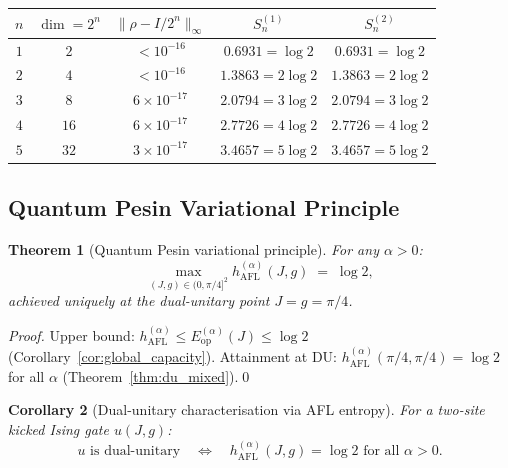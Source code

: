 \documentclass[12pt,a4paper]{article}
\newtheorem{theorem}{Theorem}[section]
\newtheorem{corollary}[theorem]{Corollary}
\begin{document}
\begin{center}
\begin{tabular}{@{}ccccc@{}}
\toprule
$n$ & $\dim=2^n$ & $\|\rho-I/2^n\|_\infty$ & $S^{(1)}_n$ & $S^{(2)}_n$\\
\midrule
$1$ & $2$  & $<10^{-16}$ & $0.6931 = \log 2$ & $0.6931 = \log 2$\\
$2$ & $4$  & $<10^{-16}$ & $1.3863 = 2\log 2$ & $1.3863 = 2\log 2$\\
$3$ & $8$  & $6\times10^{-17}$ & $2.0794 = 3\log 2$ & $2.0794 = 3\log 2$\\
$4$ & $16$ & $6\times10^{-17}$ & $2.7726 = 4\log 2$ & $2.7726 = 4\log 2$\\
$5$ & $32$ & $3\times10^{-17}$ & $3.4657 = 5\log 2$ & $3.4657 = 5\log 2$\\
\bottomrule
\end{tabular}
\end{center}

\subsection{Quantum Pesin Variational Principle}

\begin{theorem}[Quantum Pesin variational principle]\label{thm:qpvp}
For any $\alpha>0$:
\begin{equation}\label{eq:qpvp}
  \max_{(J,g)\in(0,\pi/4]^2} h^{(\alpha)}_\mathrm{AFL}(J,g)
  \;=\; \log 2,
\end{equation}
achieved uniquely at the dual-unitary point $J=g=\pi/4$.
\end{theorem}

\begin{proof}
Upper bound: $h^{(\alpha)}_\mathrm{AFL} \le E^{(\alpha)}_\mathrm{op}(J) \le \log 2$
(Corollary~\ref{cor:global_capacity}).
Attainment at DU: $h^{(\alpha)}_\mathrm{AFL}(\pi/4,\pi/4) = \log 2$ for all $\alpha$
(Theorem~\ref{thm:du_mixed}).\qed
\end{proof}

\begin{corollary}[Dual-unitary characterisation via AFL entropy]
\label{cor:du_char}
For a two-site kicked Ising gate $u(J,g)$:
\begin{equation}\label{eq:du_char}
  u \text{ is dual-unitary}
  \quad\Longleftrightarrow\quad
  h^{(\alpha)}_\mathrm{AFL}(J,g) = \log 2 \text{ for all } \alpha>0.
\end{equation}
\end{corollary}
\end{document}
